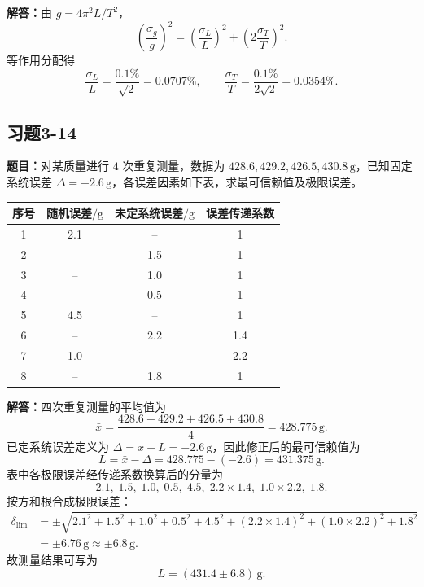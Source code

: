 \documentclass[UTF8,zihao=-4]{ctexart}
\newcommand{\problem}[1]{\subsection*{#1}}
\newcommand{\timu}{\noindent\textbf{题目：}}
\newcommand{\jieda}{\noindent\textbf{解答：}}
\begin{document}
{\jieda 由 $g=4\pi^2L/T^2$，
\begin{equation*}
    \left(\frac{\sigma_g}{g}\right)^2=\left(\frac{\sigma_L}{L}\right)^2+
    \left(2\frac{\sigma_T}{T}\right)^2.
\end{equation*}
等作用分配得
\begin{equation*}
    \frac{\sigma_L}{L}=\frac{0.1\%}{\sqrt2}=0.0707\%,
    \qquad
    \frac{\sigma_T}{T}=\frac{0.1\%}{2\sqrt2}=0.0354\%.
\end{equation*}

\problem{习题3-14}
\timu 对某质量进行 $4$ 次重复测量，数据为 $428.6,429.2,426.5,430.8\,\mathrm{g}$，已知固定系统误差 $\Delta=-2.6\,\mathrm{g}$，各误差因素如下表，求最可信赖值及极限误差。

\begin{center}
\scriptsize
\setlength{\tabcolsep}{5pt}
\begin{tabular}{c|cc|c}
\toprule
序号 & 随机误差$/\mathrm{g}$ & 未定系统误差$/\mathrm{g}$ & 误差传递系数\\
\midrule
1 & 2.1 & -- & 1\\
2 & -- & 1.5 & 1\\
3 & -- & 1.0 & 1\\
4 & -- & 0.5 & 1\\
5 & 4.5 & -- & 1\\
6 & -- & 2.2 & 1.4\\
7 & 1.0 & -- & 2.2\\
8 & -- & 1.8 & 1\\
\bottomrule
\end{tabular}
\end{center}

\jieda 四次重复测量的平均值为
\begin{equation*}
    \bar{x}=\frac{428.6+429.2+426.5+430.8}{4}=428.775\,\mathrm{g}.
\end{equation*}
已定系统误差定义为 $\Delta=x-L=-2.6\,\mathrm{g}$，因此修正后的最可信赖值为
\begin{equation*}
    L=\bar{x}-\Delta=428.775-(-2.6)=431.375\,\mathrm{g}.
\end{equation*}
表中各极限误差经传递系数换算后的分量为
\begin{equation*}
    2.1,\;1.5,\;1.0,\;0.5,\;4.5,\;2.2\times1.4,\;1.0\times2.2,\;1.8.
\end{equation*}
按方和根合成极限误差：
\begin{equation*}
\begin{aligned}
    \delta_{\lim}
    &=\pm\sqrt{2.1^2+1.5^2+1.0^2+0.5^2+4.5^2+(2.2\times1.4)^2+(1.0\times2.2)^2+1.8^2}\\
    &=\pm6.76\,\mathrm{g}\approx\pm6.8\,\mathrm{g}.
\end{aligned}
\end{equation*}
故测量结果可写为
\begin{equation*}
    L=(431.4\pm6.8)\,\mathrm{g}.
\end{equation*}

}
\end{document}
